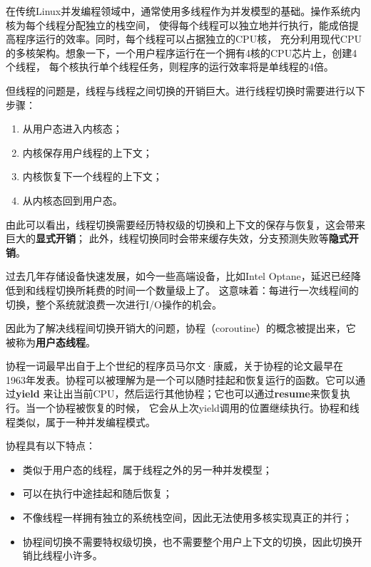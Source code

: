 \documentclass[supercite]{HustGraduPaper}
\theoremstyle{definition}
\begin{document}
在传统Linux并发编程领域中，通常使用多线程作为并发模型的基础。操作系统内核为每个线程分配独立的栈空间，
使得每个线程可以独立地并行执行，能成倍提高程序运行的效率。同时，每个线程可以占据独立的CPU核，
充分利用现代CPU的多核架构\cite{hong2011efficient}。想象一下，一个用户程序运行在一个拥有4核的CPU芯片上，创建4个线程，
每个核执行单个线程任务，则程序的运行效率将是单线程的4倍。\par

但线程的问题是，线程与线程之间切换的开销巨大\cite{david2007context}。进行线程切换时需要进行以下步骤：

\begin{enumerate}
  \item 从用户态进入内核态；
  \item 内核保存用户线程的上下文；
  \item 内核恢复下一个线程的上下文；
  \item 从内核态回到用户态。
\end{enumerate}

由此可以看出，线程切换需要经历特权级的切换和上下文的保存与恢复，这会带来巨大的\textbf{显式开销}；
此外，线程切换同时会带来缓存失效，分支预测\cite{smith1998study}失败等\textbf{隐式开销}。\par

过去几年存储设备快速发展，如今一些高端设备，比如Intel Optane\cite{izraelevitz2019basic}，延迟已经降低到和线程切换所耗费的时间一个数量级上了。
这意味着：每进行一次线程间的切换，整个系统就浪费一次进行I/O操作的机会。\par

因此为了解决线程间切换开销大的问题，协程（coroutine）的概念被提出来，它被称为\textbf{用户态线程}。

协程一词最早出自于上个世纪的程序员马尔文·康威，关于协程的论文\cite{paper1}最早在
1963年发表。协程可以被理解为是一个可以随时挂起和恢复运行的函数。它可以通过\textbf{yield}
来让出当前CPU，然后运行其他协程；它也可以通过\textbf{resume}来恢复执行。当一个协程被恢复的时候，
它会从上次yield调用的位置继续执行。协程和线程类似，属于一种并发编程模式。\par

协程具有以下特点：

\begin{itemize}
  \item 类似于用户态的线程，属于线程之外的另一种并发模型；
  \item 可以在执行中途挂起和随后恢复；
  \item 不像线程一样拥有独立的系统栈空间，因此无法使用多核实现真正的并行；
  \item 协程间切换不需要特权级切换，也不需要整个用户上下文的切换，因此切换开销比线程小许多。
\end{itemize}
\end{document}
